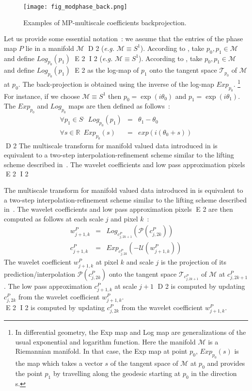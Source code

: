\begin{figure*}[htb]
\centerline{
 \vbox{
 \texttt{[image: fig\_modphase\_back.png]}
 }
 }
\caption{Examples of MP-multiscale coefficients backprojection.}
\label{fig_modphase_back}
\end{figure*}
Let us provide some essential notation~: we assume that the entries of the phase map $P$ lie in a manifold $\mathcal{M}$ 
D 2
(\textit{e.g.} $\mathcal{M}\equiv S^1$). According to \cite{rahman05}, take $p_0,p_1 \in \mathcal{M}$ and define $Log_{p_0}(p_1)$ 
E 2
I 2
(\textit{e.g.} $\mathcal{M}\equiv S^1$). According to \citep{rahman05}, take $p_0,p_1 \in \mathcal{M}$ and define $Log_{p_0}(p_1)$ 
E 2
as the log-map of $p_1$ onto the tangent space $\mathcal{T}_{p_0}$ of $\mathcal{M}$ at $p_0$. The back-projection is obtained 
using the inverse of the log-map $Exp_{p_0}$. \footnote{In differential geometry, the Exp map and Log map are generalizations of 
the usual exponential and logarithm function. Here the manifold $\mathcal{M}$ is a Riemannian manifold. In that case, the Exp map 
at point $p_0$, $Exp_{p_0}(s)$ is the map which takes a vector $s$ of the tangent space of $\mathcal{M}$ at $p_0$ and provides the 
point $p_1$ by travelling along the geodesic starting at $p_0$ in the direction s.}\\
For instance, if we choose $\mathcal{M} \equiv S^1$ then $p_0 = \exp(i \theta_0)$ and $p_1 = \exp(i \theta_1)$. The $Exp_{p_0}$ and 
$Log_{p_0}$ maps are then defined as follows~:
\begin{eqnarray}
\forall p_1 \in S^, \,\,\,  Log_{p_0} (p_1) & = & \theta_1 - \theta_0 \\
\forall s \in \mathbb{R} \,\,\, Exp_{p_0} (s) & = & exp(i(\theta_0 + s))
\end{eqnarray}
D 2
The multiscale transform for manifold valued data introduced in \cite{rahman05} is equivalent to a two-step interpolation-refinement 
scheme similar to the lifting scheme described in~\cite{wave:sweldens98}. The wavelet coefficients and low pass approximation pixels 
E 2
I 2

The multiscale transform for manifold valued data introduced in \citep{rahman05} is equivalent to a two-step interpolation-refinement 
scheme similar to the lifting scheme described in~\citep{wave:sweldens98}. The wavelet coefficients and low pass approximation pixels 
E 2
are then computed as follows at each scale $j$ and pixel $k$~:
\begin{eqnarray}\label{eq:mani}
w_{j+1,k}^P & = & Log_{c_{j,2k+1}^P}\left(\mathcal{P}(c_{j,2k}^P)\right)   \\
c_{j+1,k}^P & = & Exp_{c_{j,2k}^P} ( -\mathcal{U}(w_{j+1,k}^P))
\label{eq:mani2}
\end{eqnarray}
The wavelet coefficient $w_{j+1,k}^P$ at pixel $k$ and scale $j$ is the projection of its prediction/interpolation $\mathcal{P}(c_{j,2k}^P)$ 
onto the tangent space $\mathcal{T}_{c_{j,2k+1}^P}$ of $\mathcal{M}$ at $c_{j,2k+1}^P$. The low pass approximation $c_{j+1,k}^P$ at scale $j+1$ 
D 2
is computed by updating $c_{j,2k}^P$ from the wavelet coefficient $w_{j+1,k}^P$.\\
E 2
I 2
is computed by updating $c_{j,2k}^P$ from the wavelet coefficient $w_{j+1,k}^P$.

